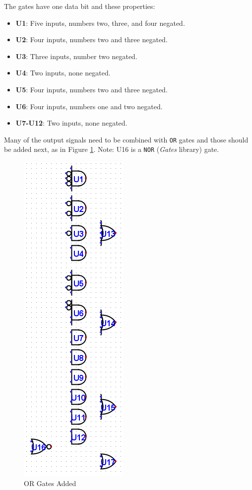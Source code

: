 The gates have one data bit and these properties:

\begin{itemize}
	\item \textbf{U1}: Five inputs, numbers two, three, and four negated.
	\item \textbf{U2}: Four inputs, numbers two and three negated.
	\item \textbf{U3}: Three inputs, number two negated.
	\item \textbf{U4}: Two inputs, none negated.
	\item \textbf{U5}: Four inputs, numbers two and three negated.
	\item \textbf{U6}: Four inputs, numbers one and two negated.
	\item \textbf{U7-U12}: Two inputs, none negated. 
\end{itemize}

Many of the output signals need to be combined with \texttt{OR} gates and those should be added next, as in Figure \ref{fig:03-02}. Note: U16 is a \texttt{NOR} (\textit{Gates} library) gate.

\begin{figure}[H]
	\centering
	\includegraphics[width=\maxwidth{.95\linewidth}]{gfx/03-02}
	\caption{OR Gates Added}
	\label{fig:03-02}
\end{figure}

